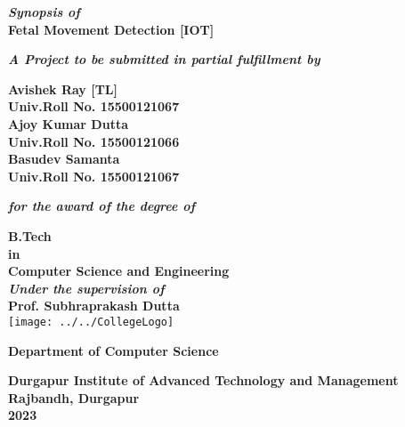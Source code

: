 \documentclass[12pt,a4paper,oneside]{report}
\begin{document}
	\thispagestyle{empty}
	\begin{center}
		{\textbf{\textit{Synopsis of}\\}}
		{\Large\bf{Fetal Movement Detection [IOT]} \\}
		
		
		\vspace{0.3in}
		
		
		{\textbf{\textit  {A Project to be submitted in partial fulfillment by\\}}}
		
		
		
		\vspace{0.4in}
		\textbf{\Large Avishek Ray [TL]
			\\ \small Univ.Roll No. 15500121067
			\\ \Large Ajoy Kumar Dutta
			\\ \small Univ.Roll No. 15500121066
			\\ \Large Basudev Samanta
			\\ \small Univ.Roll No. 15500121067\\}
		
		
		\vspace{0.3 in}
		
		{\bf\textit{for the award of the degree of}}
		
		\vspace {0.3 in}
		
		
		{\Large{\bf B.Tech \\ \small in \\\Large Computer Science and Engineering }\\}
		\vspace{0.3in}
		{\bf\textit{Under the supervision of\\ }}
		{\Large{\bf Prof. Subhraprakash Dutta}\\}    
		\vspace{0.3in}
		\texttt{[image: ../../CollegeLogo]}
		
		
		{\large\bf Department of Computer Science\\}
		
		{\large\bf  Durgapur Institute of Advanced Technology and Management \\}
		{\large\bf Rajbandh, Durgapur \\}
		{\large\bf  2023 }
	\end{center}
	\date{}
	\setcounter{page}{0}
	
\end{document}
